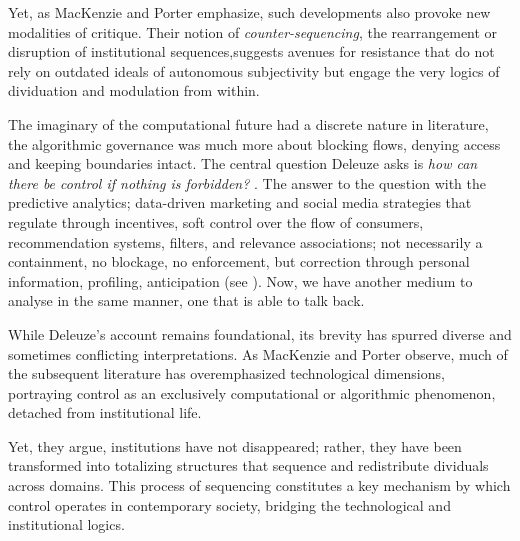 


\begin{orangebox}
	Yet, as MacKenzie and Porter emphasize, such developments also provoke new modalities of critique. Their notion of \textit{counter-sequencing}, the rearrangement or disruption of institutional sequences,suggests avenues for resistance that do not rely on outdated ideals of autonomous subjectivity but engage the very logics of dividuation and modulation from within.
\end{orangebox}

The imaginary of the computational future had a discrete nature in literature, the
algorithmic governance was much more about blocking flows, denying access and
keeping boundaries intact. The central question Deleuze asks is \textit{how can
	there be control if nothing is forbidden?} \parencite[2]{brusseau2020}. The
answer to the question with the predictive analytics; data-driven marketing and social media strategies that regulate through incentives, soft control over the flow of consumers, recommendation systems, filters, and relevance associations; not necessarily a containment, no blockage, no enforcement, but correction through personal information, profiling, anticipation (see \cite[2]{brusseau2020}). Now, we have another medium to analyse in the same manner, one that is able to talk back.


While Deleuze's account remains foundational, its brevity has spurred diverse and sometimes conflicting interpretations. As MacKenzie and Porter \parencite*{mackenzie2021} observe, much of the subsequent literature has overemphasized technological dimensions, portraying control as an exclusively computational or algorithmic phenomenon, detached from institutional life.


\begin{orangebox}


	Yet, they argue, institutions have not disappeared; rather, they have been transformed into totalizing structures that sequence and redistribute dividuals across domains. This process of sequencing constitutes a key mechanism by which control operates in contemporary society, bridging the technological and institutional logics.

\end{orangebox}



